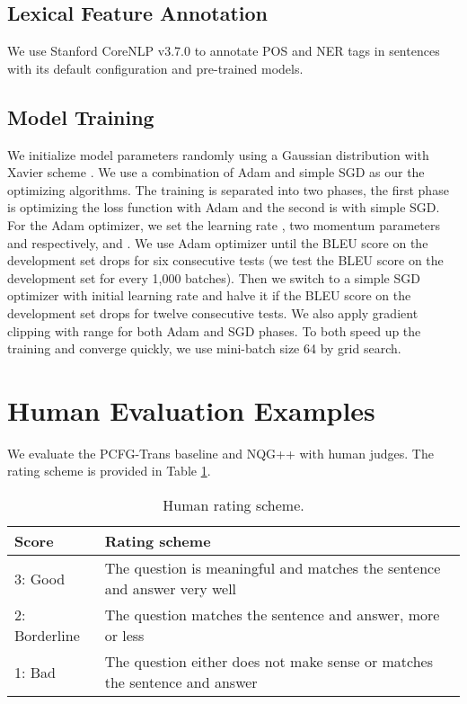 \documentclass[11pt,letterpaper]{article}
\newcommand{\ourModelName}{NQG}
\begin{document}
\subsection{Lexical Feature Annotation}
We use Stanford CoreNLP v3.7.0 \citep{manning-EtAl:2014:P14-5} to annotate POS and NER tags in sentences with its default configuration and pre-trained models.

\subsection{Model Training}
We initialize model parameters randomly using a Gaussian distribution with Xavier scheme \citep{glorot2010understanding}.
We use a combination of Adam \citep{kingma2014adam} and simple SGD as our the optimizing algorithms.
The training is separated into two phases, the first phase is optimizing the loss function with Adam and the second is with simple SGD.
For the Adam optimizer, we set the learning rate , two momentum parameters  and  respectively, and .
We use Adam optimizer until the BLEU score on the development set drops for six consecutive tests (we test the BLEU score on the development set for every 1,000 batches).
Then we switch to a simple SGD optimizer with initial learning rate  and halve it if the BLEU score on the development set drops for twelve consecutive tests.
We also apply gradient clipping \citep{pascanu2013difficulty} with range  for both Adam and SGD phases.
To both speed up the training and converge quickly, we use mini-batch size 64 by grid search.


\section{Human Evaluation Examples}
We evaluate the PCFG-Trans baseline and \ourModelName{}++ with human judges.
The rating scheme is provided in Table \ref{tbl:humanEvaStand}.
\begin{table}[htbp]
	\begin{center}
		\begin{tabular}{lp{}}
			\toprule
			Score &  Rating scheme \\
			\midrule
			3: Good & The question is meaningful and matches the sentence and answer very well \\
			\hline
			2: Borderline & The question matches the sentence and answer, more or less \\
			\hline
			1: Bad & The question either does not make sense or matches the sentence and answer \\
			\bottomrule
		\end{tabular}
	\end{center}
	\caption{\label{tbl:humanEvaStand} Human rating scheme.}
\end{table}
\end{document}
